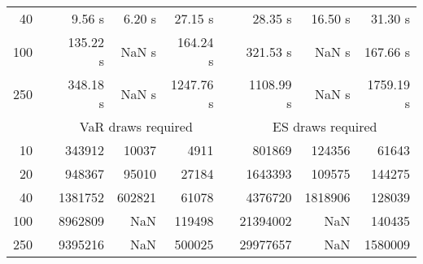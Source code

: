 {{\begin{longtable}{rr rrr r rrr}
40 & & 9.56 s & 6.20 s & 27.15 s && 28.35 s & 16.50 s & 31.30 s \\ 
100 & & 135.22 s &  NaN s & 164.24 s && 321.53 s &  NaN s & 167.66 s \\ 
250 & & 348.18 s &  NaN s & 1247.76 s && 1108.99 s &  NaN s & 1759.19 s \\ 
\hline 
 && \multicolumn{3}{c}{VaR draws required} &&   \multicolumn{3}{c}{ES draws required} \\  \cline{3-5}  \cline{7-9} 
10 & & 343912 & 10037 & 4911 && 801869 & 124356 & 61643 \\ 
20 & & 948367 & 95010 & 27184 && 1643393 & 109575 & 144275 \\ 
40 & & 1381752 & 602821 & 61078 && 4376720 & 1818906 & 128039 \\ 
100 & & 8962809 & NaN & 119498 && 21394002 & NaN & 140435 \\ 
250 & & 9395216 & NaN & 500025 && 29977657 & NaN & 1580009 \\ 
\hline 
\end{longtable} 
} 
} 
